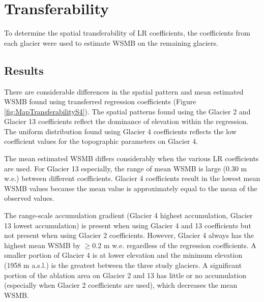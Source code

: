 \documentclass[12pt]{article}
\begin{document}
\section{Transferability}
\label{sec:transferability}

To determine the spatial transferability of LR coefficients, the coefficients from each glacier were used to estimate WSMB on the remaining glaciers. 


\subsection{Results}

There are considerable differences in the spatial pattern and mean estimated WSMB found using transferred regression coefficients (Figure \ref{fig:MapTransferabilityS4}). The spatial patterns found using the Glacier 2 and Glacier 13 coefficients reflect the dominance of elevation within the regression. The uniform distribution found using Glacier 4 coefficients reflects the low coefficient values for the topographic parameters on Glacier 4. 

The mean estimated WSMB differs considerably when the various LR coefficients are used. For Glacier 13 especially, the range of mean WSMB is large (0.30 m w.e.) between different coefficients. Glacier 4 coefficients result in the lowest mean WSMB values because the mean value is approximately equal to the mean of the observed values.

The range-scale accumulation gradient (Glacier 4 highest accumulation, Glacier 13 lowest accumulation) is present when using Glacier 4 and 13 coefficients but not present when using Glacier 2 coefficients. However, Glacier 4 always has the highest mean WSMB by $\geq0.2$ m w.e. regardless of the regression coefficients. A smaller portion of Glacier 4 is at lower elevation and the minimum elevation (1958 m a.s.l.) is the greatest between the three study glaciers. A significant portion of the ablation area on Glacier 2 and 13 has little or no accumulation (especially when Glacier 2 coefficients are used), which decreases the mean WSMB.  
\end{document}
